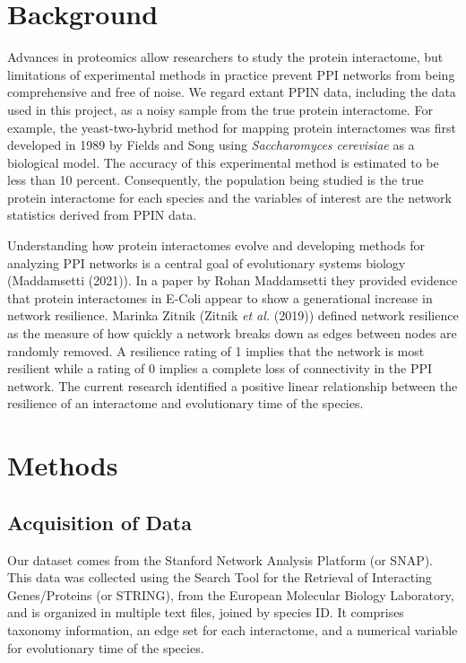 \documentclass[12pt]{article}
\begin{document}
\section{Background}
Advances in proteomics allow researchers to study the protein interactome, but limitations of experimental methods in practice prevent PPI networks from being comprehensive and free of noise. We regard extant PPIN data, including the data used in this project, as a noisy sample from the true protein interactome. For example, the yeast-two-hybrid method for mapping protein interactomes was first developed in 1989 by Fields and Song using \textit{Saccharomyces cerevisiae} as a biological model. The accuracy of this experimental method is estimated to be less than 10 percent. Consequently, the population being studied is the true protein interactome for each species and the variables of interest are the network statistics derived from PPIN data.

Understanding how protein interactomes evolve and developing methods for analyzing PPI networks is a central goal of evolutionary systems biology (Maddamsetti (2021)). In a paper by Rohan Maddamsetti they provided evidence that protein interactomes in E-Coli appear to show a generational increase in network resilience. Marinka Zitnik (Zitnik \textit{et al.} (2019)) defined network resilience as the measure of how quickly a network breaks down as edges between nodes are randomly removed. A resilience rating of 1 implies that the network is most resilient while a rating of 0 implies a complete loss of connectivity in the PPI network. The current research identified a positive linear relationship between the resilience of an interactome and evolutionary time of the species.

\section{Methods}
\subsection{Acquisition of Data}
Our dataset comes from the Stanford Network Analysis Platform (or SNAP). This data was collected using the Search Tool for the Retrieval of Interacting Genes/Proteins (or STRING), from the European Molecular Biology Laboratory, and is organized in multiple text files, joined by species ID. It comprises taxonomy information, an edge set for each interactome, and a numerical variable for evolutionary time of the species.
\end{document}

